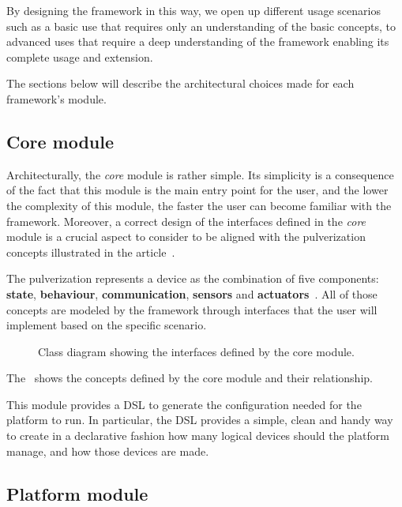 By designing the framework in this way, we open up different usage scenarios such as a basic use that requires only an understanding of the
basic concepts, to advanced uses that require a deep understanding of the framework enabling its complete usage and extension.


The sections below will describe the architectural choices made for each framework's module.

\subsection{Core module}
\label{sec:core-module}

Architecturally, the \emph{core} module is rather simple. Its simplicity is a consequence of the fact that this module is the main entry point
for the user, and the lower the complexity of this module, the faster the user can become familiar with the framework.
Moreover, a correct design of the interfaces defined in the \emph{core} module is a crucial aspect to consider to be aligned with the
pulverization concepts illustrated in the article~\cite{fi12110203}.

The pulverization represents a device as the combination of five components: \textbf{state}, \textbf{behaviour}, \textbf{communication},
\textbf{sensors} and \textbf{actuators}~\cite{fi12110203}.
All of those concepts are modeled by the framework through interfaces that the user will implement based on the specific scenario.

\begin{figure}
	\centering
	\caption{Class diagram showing the interfaces defined by the core module.}
	\label{fig:core-module-architecture}
\end{figure}

The~ shows the concepts defined by the core module and their relationship.

This module provides a DSL to generate the configuration needed for the platform to run. In particular, the DSL provides a simple, clean and handy
way to create in a declarative fashion how many logical devices should the platform manage, and how those devices are made.

\subsection{Platform module}
\label{sec:platform-module}


